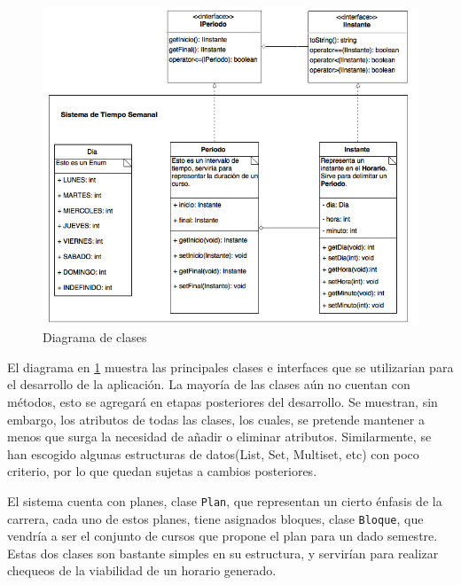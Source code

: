 \documentclass[paper=letter, fontsize=12pt]{article}
\begin{document}
\begin{figure}[H]
  \centering
  \includegraphics[scale=0.6]{HorariosCursos2.png}
  \caption{Diagrama de clases}
  \label{F:diaClases}
\end{figure}

El diagrama en \ref{F:diaClases} muestra las principales clases e interfaces que
se utilizarian para el desarrollo de la aplicación. La mayoría de las clases aún
no cuentan con métodos, esto se agregará en etapas posteriores del desarrollo.
Se muestran, sin embargo, los atributos de todas las clases, los cuales, se
pretende mantener a menos que surga la necesidad de añadir o eliminar atributos.
Similarmente, se han escogido algunas estructuras de datos(List, Set, Multiset,
etc) con poco criterio, por lo que quedan sujetas a cambios posteriores.

El sistema cuenta con planes, clase \texttt{Plan}, que representan un cierto
énfasis de la carrera, cada uno de estos planes, tiene asignados bloques, clase
\texttt{Bloque}, que vendría a ser el conjunto de cursos que propone el plan
para un dado semestre. Estas dos clases son bastante simples en su estructura,
y servirían para realizar chequeos de la viabilidad de un horario generado.
\end{document}

